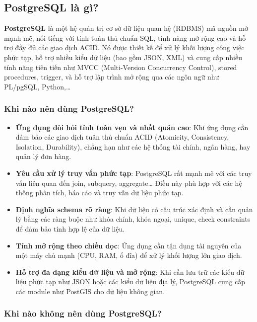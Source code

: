 \newpage

\subsection{PostgreSQL là gì?}

\textbf{PostgreSQL} là một hệ quản trị cơ sở dữ liệu quan hệ (RDBMS) mã nguồn mở mạnh mẽ, nổi tiếng với tính tuân thủ chuẩn SQL, tính năng mở rộng cao và hỗ trợ đầy đủ các giao dịch ACID. Nó được thiết kế để xử lý khối lượng công việc phức tạp, hỗ trợ nhiều kiểu dữ liệu (bao gồm JSON, XML) và cung cấp nhiều tính năng tiên tiến như MVCC (Multi-Version Concurrency Control), stored procedures, trigger, và hỗ trợ lập trình mở rộng qua các ngôn ngữ như PL/pgSQL, Python,…

\subsubsection{Khi nào nên dùng PostgreSQL?}

\begin{itemize}
    \item \textbf{Ứng dụng đòi hỏi tính toàn vẹn và nhất quán cao}: Khi ứng dụng cần đảm bảo các giao dịch tuân thủ chuẩn ACID (Atomicity, Consistency, Isolation, Durability), chẳng hạn như các hệ thống tài chính, ngân hàng, hay quản lý đơn hàng.
    \item \textbf{Yêu cầu xử lý truy vấn phức tạp}: PostgreSQL rất mạnh mẽ với các truy vấn liên quan đến join, subquery, aggregate… Điều này phù hợp với các hệ thống phân tích, báo cáo và truy vấn dữ liệu phức tạp.
    \item \textbf{Định nghĩa schema rõ ràng}: Khi dữ liệu có cấu trúc xác định và cần quản lý bằng các ràng buộc như khóa chính, khóa ngoại, unique, check constraints để đảm bảo tính hợp lệ của dữ liệu.
    \item \textbf{Tính mở rộng theo chiều dọc}: Ứng dụng cần tận dụng tài nguyên của một máy chủ mạnh (CPU, RAM, ổ đĩa) để xử lý khối lượng lớn giao dịch.
    \item \textbf{Hỗ trợ đa dạng kiểu dữ liệu và mở rộng}: Khi cần lưu trữ các kiểu dữ liệu phức tạp như JSON hoặc các kiểu dữ liệu địa lý, PostgreSQL cung cấp các module như PostGIS cho dữ liệu không gian.
\end{itemize}

\subsubsection{Khi nào không nên dùng PostgreSQL?}

